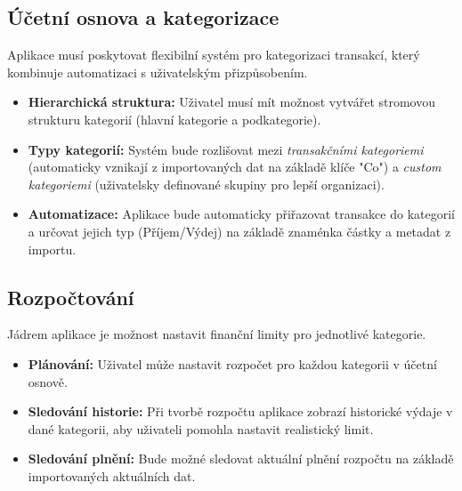 \documentclass[
program=itk,
biblatex,
language=czech,
font=sans,
figures=true,
tables=false,
sourcecodes=false,
glossaries,
index
]{kidiplom}
\begin{document}
\subsection{Účetní osnova a kategorizace}
Aplikace musí poskytovat flexibilní systém pro kategorizaci transakcí, který kombinuje automatizaci s uživatelským přizpůsobením.
\begin{itemize}
    \item \textbf{Hierarchická struktura:} Uživatel musí mít možnost vytvářet stromovou strukturu kategorií (hlavní kategorie a podkategorie).
    \item \textbf{Typy kategorií:} Systém bude rozlišovat mezi \textit{transakčními kategoriemi} (automaticky vznikají z importovaných dat na základě klíče "Co") a \textit{custom kategoriemi} (uživatelsky definované skupiny pro lepší organizaci).
    \item \textbf{Automatizace:} Aplikace bude automaticky přiřazovat transakce do kategorií a určovat jejich typ (Příjem/Výdej) na základě znaménka částky a metadat z importu.
\end{itemize}

\subsection{Rozpočtování}
Jádrem aplikace je možnost nastavit finanční limity pro jednotlivé kategorie.
\begin{itemize}
    \item \textbf{Plánování:} Uživatel může nastavit rozpočet pro každou kategorii v účetní osnově.
    \item \textbf{Sledování historie:} Při tvorbě rozpočtu aplikace zobrazí historické výdaje v dané kategorii, aby uživateli pomohla nastavit realistický limit.
    \item \textbf{Sledování plnění:} Bude možné sledovat aktuální plnění rozpočtu na základě importovaných aktuálních dat.
\end{itemize}
\end{document}
